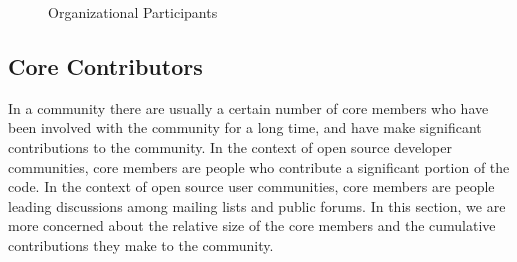 \documentclass[conference]{IEEEtran}
\begin{document}
\begin{figure}[t!]
\centering
  \hspace{50pt} 
  \caption{Organizational Participants} 
  \vspace{-10pt}
  \label{fig:org_contributor} 
\end{figure}

\subsection{Core Contributors}

In a community there are usually a certain number of core members who have been involved with the community for a long time, and have make significant contributions to the community. In the context of open source developer communities, core members are people who contribute a significant portion of the code. In the context of open source user communities, core members are people leading discussions among mailing lists and public forums. In this section, we are more concerned about the relative size of the core members and the cumulative contributions they make to the community. 
\end{document}
